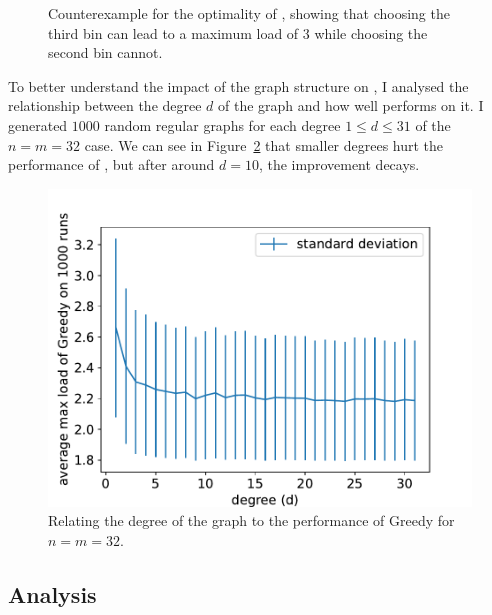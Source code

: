 \begin{figure}
    \centering
    \caption{Counterexample for the optimality of \Greedy, showing that choosing the third bin can lead to a maximum load of $3$ while choosing the second bin cannot.}
    \label{greedy-counterexample}
\end{figure}



To better understand the impact of the graph structure on \Greedy, I analysed the relationship between the degree $d$ of the graph and how well \Greedy performs on it. I generated $1000$ random regular graphs for each degree $1\leq d \leq 31$ of the $n=m=32$ case. We can see in Figure~\ref{greedy-random-regular-analysis} that smaller degrees hurt the performance of \Greedy, but after around $d=10$, the improvement decays.


\begin{figure}[ht]
    \centering
    \includegraphics[scale=0.6]{Chapter4/Figs/greedy_degree_analysis_32_32.pdf}
    \caption{Relating the degree of the graph to the performance of Greedy for $n=m=32$.}
    \label{greedy-random-regular-analysis}
\end{figure}


\subsection{\DQL Analysis} \label{dql-analysis-graphical-two-choice}

